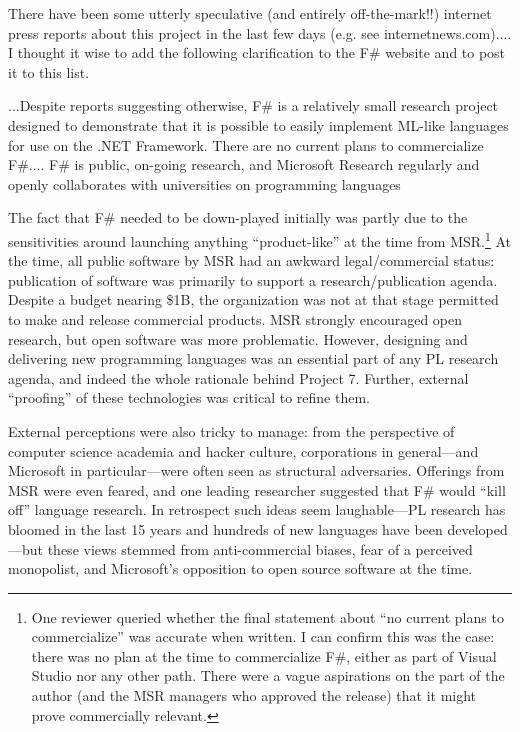 \documentclass[acmsmall,screen]{acmart}
\begin{document}
\begin{verbquote}
There have been some utterly speculative (and entirely off-the-mark!!) internet press reports about this project in the last few days (e.g. see internetnews.com).... I thought it wise to add the following clarification to the F# website and to post it to this list.

...Despite reports suggesting otherwise, F# is a relatively small research project designed to demonstrate that it is possible to easily implement ML-like languages for use on the .NET Framework.  There are no current plans to commercialize F#.... F# is public, on-going research, and Microsoft Research regularly and openly collaborates with universities on programming languages
\end{verbquote}

The fact that F\# needed to be down-played initially was partly due to the sensitivities around launching anything “product-like” at the
time from MSR.\footnote{One reviewer queried whether the final statement about ``no current plans to commercialize'' was accurate
when written.  I can confirm this was the case: there was no plan at the time to commercialize F\#, either as part of Visual Studio nor any
other path. There were a vague aspirations on the part of the author (and the MSR managers who approved the release) that it might
prove commercially relevant.} At the time, all public software by MSR had an awkward legal/commercial status: publication of software
was primarily to support a research/publication agenda. Despite a budget nearing \$1B, the organization was not at that stage permitted
to make and release commercial products.  MSR strongly encouraged open research, but open software was more problematic. However,
designing and delivering new programming languages was an essential part of any PL research agenda, and indeed the whole rationale
behind Project 7.  Further, external “proofing” of these technologies was critical to refine them. 

External perceptions were also tricky to manage: from the perspective of computer science academia and hacker culture, corporations
in general---and Microsoft in particular---were often seen as structural adversaries. Offerings from MSR were even feared, and one
leading researcher suggested that F\# would “kill off” language research.  In retrospect such ideas seem laughable---PL research has
bloomed in the last 15 years and hundreds of new languages have been developed---but these views stemmed from anti-commercial
biases, fear of a perceived monopolist, and Microsoft’s opposition to open source software at the time. 
\end{document}
